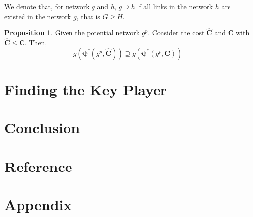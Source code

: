 \documentclass[12pt]{article}
\theoremstyle{definition}
\newtheorem{proposition}{Proposition}
\begin{document}
We denote that, for network $g$ and $h$, $g \supseteq h$ if all links in the network $h$ are existed in the network $g$, that is $G \ge H$.

\begin{proposition}
Given the potential network $g^p$.
Consider the cost $\bm{\hat{C}}$ and $\bm{C}$ with $\bm{\hat{C}} \le \bm{C}$.
Then,
\[ g(\bm{\psi}^*(g^p, \bm{\hat{C}})) \supseteq g(\bm{\psi}^*(g^p, \bm{C})) \]
\end{proposition}




\section{Finding the Key Player}


\section{Conclusion}


\section{Reference}


\section{Appendix}
\end{document}
